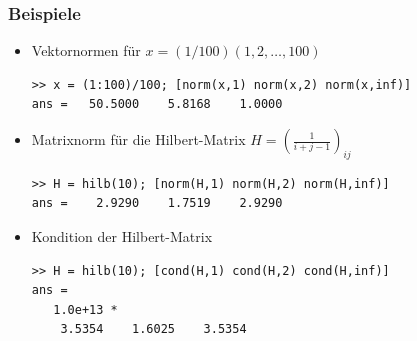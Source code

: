 \documentclass[hyperref={xetex}]{beamer}
\begin{document}
% 
%
\begin{frame}[fragile]\frametitle{Beispiele}
\begin{itemize}
\item Vektornormen für $x=(1/100) (1, 2, \dots, 100)$
\begin{lstlisting}
>> x = (1:100)/100; [norm(x,1) norm(x,2) norm(x,inf)]
ans =   50.5000    5.8168    1.0000
\end{lstlisting}
\item Matrixnorm für die Hilbert-Matrix $H=(\frac{1}{i+j-1})_{ij}$
\begin{lstlisting}
>> H = hilb(10); [norm(H,1) norm(H,2) norm(H,inf)]
ans =    2.9290    1.7519    2.9290
\end{lstlisting}
\item Kondition der Hilbert-Matrix
\begin{lstlisting}
>> H = hilb(10); [cond(H,1) cond(H,2) cond(H,inf)]
ans =
   1.0e+13 *
    3.5354    1.6025    3.5354
\end{lstlisting}
\end{itemize}
\end{frame}
\end{document}
